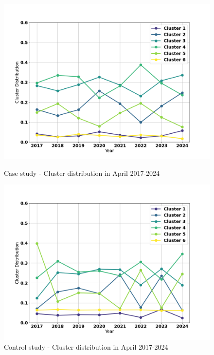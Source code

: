 \documentclass[10pt,twocolumn]{article}
\begin{document}

\begin{figure}[h]
  \centering

  \begin{minipage}{1\columnwidth}
      \centering
      \includegraphics[width=\textwidth]{images/results/april/case/cluster_distribution_6_april.png}
      \caption{Case study - Cluster distribution in April 2017-2024} 
      \label{fig:case_april_clust_dist}
  \end{minipage}
  \hfill
  \begin{minipage}{1\columnwidth}
      \centering
      \includegraphics[width=\textwidth]{images/results/april/control/cluster_distribution_6_april.png}
      \caption{Control study - Cluster distribution in April 2017-2024}
      \label{fig:control_april_clust_dist}
  \end{minipage}

\end{figure}
\end{document}
